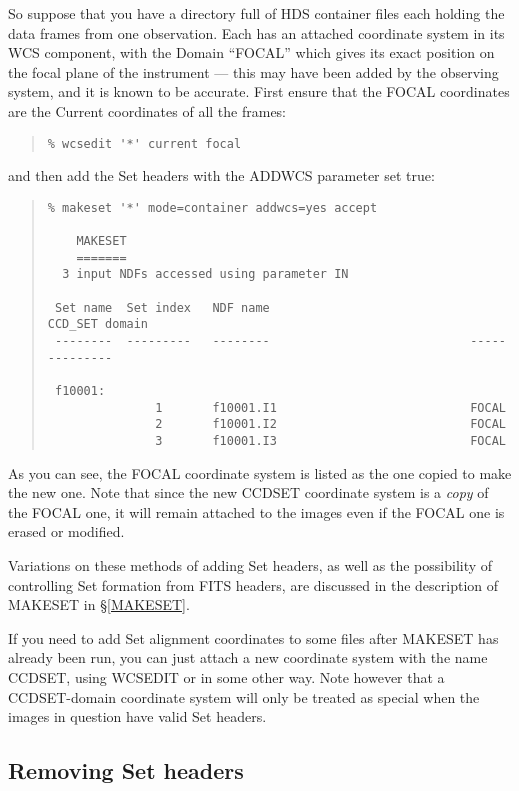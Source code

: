 \documentclass[twoside,11pt]{article}
\newcommand{\hyperref}[4]{#2\ref{#4}#3}
\newcommand{\htmlref}[2]{#1}
\newcommand{\latexhtml}[2]{#1}
\renewcommand{\_}{\texttt{\symbol{95}}}
\newcommand{\ttsize}{\latexhtml{\small}{}}
\newenvironment{myquote}{\begin{quote}\ttsize}{\end{quote}}
\newcommand{\routine}[1]{{\sc #1}}
\newcommand{\xroutine}[1]{\htmlref{{\sc #1}}{#1}}
\begin{document}
So suppose that you have a directory full of HDS container files
each holding the data frames from one observation.
Each has an attached coordinate system in its WCS component,
with the Domain ``FOCAL'' which gives its exact position on the focal 
plane of the instrument --- this may have been added by the observing
system, and it is known to be accurate.
First ensure that the FOCAL coordinates are the Current coordinates
of all the frames:
\begin{myquote}
\begin{verbatim}
% wcsedit '*' current focal
\end{verbatim}
\end{myquote}
and then add the Set headers with the ADDWCS parameter set true:
\begin{myquote}
\begin{verbatim}
% makeset '*' mode=container addwcs=yes accept

    MAKESET
    =======
  3 input NDFs accessed using parameter IN

 Set name  Set index   NDF name                            CCD_SET domain
 --------  ---------   --------                            --------------

 f10001:
               1       f10001.I1                           FOCAL  
               2       f10001.I2                           FOCAL  
               3       f10001.I3                           FOCAL  
\end{verbatim}
\end{myquote}
As you can see, the FOCAL coordinate system is listed as the one copied to
make the new one.
Note that since the new CCD\_SET coordinate system is a {\em copy\/}
of the FOCAL one, it will
remain attached to the images even if the FOCAL one is erased or modified.

Variations on these methods of adding Set headers, as well as the
possibility of controlling Set formation from FITS headers,
are discussed in the description of \routine{MAKESET}
in \hyperref{the appendix}{\S}{}{MAKESET}.

If you need to add Set alignment coordinates to some files after 
\routine{MAKESET} has already been run, you can just attach a new 
coordinate system with the name CCD\_SET, using \xroutine{WCSEDIT} or
in some other way.
Note however that a CCD\_SET-domain coordinate system 
will only be treated as special when the images in
question have valid Set headers.


\subsection{Removing Set headers}
\end{document}
